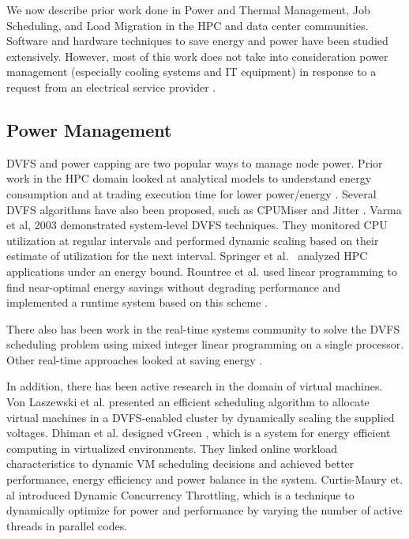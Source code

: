 We now describe prior work done in Power and Thermal Management, Job Scheduling, and Load Migration in the HPC and data center communities. Software and hardware techniques to save energy and power have been studied extensively. However, most of this work does not take into consideration power management (especially cooling systems and IT equipment) in response to a request from an electrical service provider \cite {Ghatikar2012a}. 

\subsection{Power Management}
DVFS and power capping are two popular ways to manage node power. Prior work in the HPC domain looked at analytical models to understand energy consumption \cite{SpringerPPoPP2006,GeICPP2007,LiHPCA2006} and at trading execution time for lower power/energy \cite{CameronSC2005,HsuSC2005}. Several DVFS algorithms have also been proposed, such as CPUMiser \cite{GeICPP2007} and Jitter \cite{KappiahSC2005}. Varma et al, 2003 \cite{varma_control-theoretic_2003} demonstrated system-level DVFS techniques. They monitored CPU utilization at regular intervals and performed dynamic scaling based on their estimate of utilization for the next interval. Springer et al.~\cite{springer:06} analyzed HPC applications under an energy bound. Rountree et al. used linear programming to find near-optimal energy savings without degrading performance \cite{rountree:07} and implemented a runtime system based on this scheme \cite{rountree:09}. 

There also has been work in the real-time systems community to solve the DVFS scheduling problem using mixed integer linear programming on a single processor\cite{IshiharaISLPED1998,SaputraLCTES2002,SwaminathanRTSS2000,SwaminathanASPDAC2001}. Other real-time approaches looked at saving energy \cite{MoncusiRTSS2003,MochockiICCAD2002,MochockiRTAS2005,ZhuTPDS2003,ZhangDAC2002}. 

In addition, there has been active research in the domain of virtual machines. Von Laszewski et al. \cite{von_laszewski_power-aware_2009} presented an efficient scheduling algorithm to allocate virtual machines in a DVFS-enabled cluster by dynamically scaling the supplied voltages. Dhiman et al. designed vGreen \cite{dhiman_vgreen:_2009}, which is a system for energy efficient computing in 
virtualized environments. They linked online workload characteristics to dynamic VM scheduling decisions and achieved better performance, energy
efficiency and power balance in the system. Curtis-Maury et. al \cite{Curtis1,Curtis2,Curtis3} introduced Dynamic Concurrency Throttling, which is a technique to dynamically optimize for power and performance by varying the number of active threads in parallel codes. 

